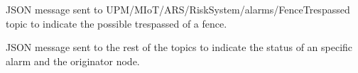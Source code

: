 JSON message sent to UPM/MIoT/ARS/RiskSystem/alarms/FenceTrespassed topic to indicate the possible trespassed of a fence.


JSON message sent to the rest of the topics to indicate the status of an specific alarm and the originator node.


